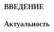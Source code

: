 \newpage
\renewcommand{\contentsname}{\centerline{\large СОДЕРЖАНИЕ}}
\tableofcontents
\setcounter{page}{2}

\newpage
\begin{flushleft}
  \textbf{\large ВВЕДЕНИЕ}
\end{flushleft}


\textbf{Актуальность}

\newpage
